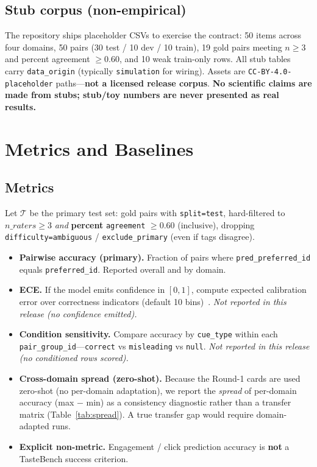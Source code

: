\documentclass[11pt,a4paper]{article}
\begin{document}
\subsection{Stub corpus (non-empirical)}

The repository ships placeholder CSVs to exercise the contract: 50 items across four domains, 50 pairs (30 test / 10 dev / 10 train), 19 gold pairs meeting $n \ge 3$ and percent agreement $\ge 0.60$, and 10 weak train-only rows. All stub tables carry \texttt{data\_origin} (typically \texttt{simulation} for wiring). Assets are \texttt{CC-BY-4.0-placeholder} paths---\textbf{not a licensed release corpus}. \textbf{No scientific claims are made from stubs; stub/toy numbers are never presented as real results.}

\section{Metrics and Baselines}
\label{sec:metrics}

\subsection{Metrics}

Let $\mathcal{T}$ be the primary test set: gold pairs with \texttt{split=test}, hard-filtered to $n\_raters \ge 3$ \emph{and} \textbf{percent} \texttt{agreement} $\ge 0.60$ (inclusive), dropping \texttt{difficulty=ambiguous} / \texttt{exclude\_primary} (even if tags disagree).

\begin{itemize}[leftmargin=*,itemsep=2pt]
  \item \textbf{Pairwise accuracy (primary).} Fraction of pairs where \texttt{pred\_preferred\_id} equals \texttt{preferred\_id}. Reported overall and by domain.
  \item \textbf{ECE.} If the model emits confidence in $[0,1]$, compute expected calibration error over correctness indicators (default 10 bins)~\citep{guo2017calibration}. \emph{Not reported in this release (no confidence emitted).}
  \item \textbf{Condition sensitivity.} Compare accuracy by \texttt{cue\_type} within each \texttt{pair\_group\_id}---\texttt{correct} vs \texttt{misleading} vs \texttt{null}. \emph{Not reported in this release (no conditioned rows scored).}
  \item \textbf{Cross-domain spread (zero-shot).} Because the Round-1 cards are used zero-shot (no per-domain adaptation), we report the \emph{spread} of per-domain accuracy (max $-$ min) as a consistency diagnostic rather than a transfer matrix (Table~\ref{tab:spread}). A true transfer gap would require domain-adapted runs.
  \item \textbf{Explicit non-metric.} Engagement / click prediction accuracy is \textbf{not} a TasteBench success criterion.
\end{itemize}
\end{document}
